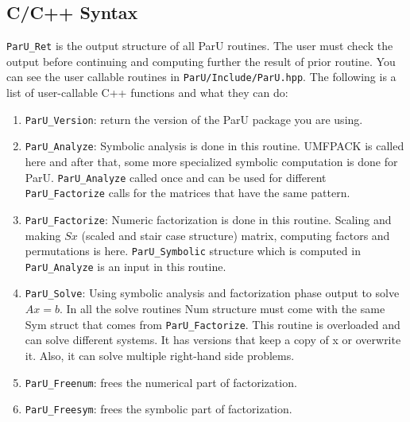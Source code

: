 \documentclass[12pt]{article}
\begin{document}
\subsection{C/C++ Syntax}
\verb'ParU_Ret' is the output structure of all ParU routines. The user must 
check the output before continuing and computing further the result of prior
routine. You can see the user callable routines in 
\verb'ParU/Include/ParU.hpp'.
The following is a list of user-callable C++ functions and what they
can do:

\begin{enumerate}

    \item \verb'ParU_Version': return the version of the ParU package 
        you are using.

    \item \verb'ParU_Analyze': Symbolic analysis is done in this routine. 
        UMFPACK is called here and after that, some more specialized symbolic
        computation is done for ParU. 
        \verb'ParU_Analyze' called once and can be used for different 
        \verb'ParU_Factorize' calls for the matrices that have the same pattern.
    \item \verb'ParU_Factorize': 
        Numeric factorization is done in this routine. Scaling and
        making $Sx$ (scaled and stair case structure) matrix, computing factors 
        and permutations is here. \verb'ParU_Symbolic' structure which is 
        computed in \verb'ParU_Analyze' is an input in this routine.

    \item \verb'ParU_Solve':  
        Using symbolic analysis and factorization phase output to solve $Ax=b$.
        In all the solve routines Num structure must come with the same 
        Sym struct that comes from \verb'ParU_Factorize'. 
        This routine is overloaded and can solve different systems. It has 
        versions that keep a copy of x or overwrite it. Also, it can solve 
        multiple right-hand side problems.

    \item \verb'ParU_Freenum':  frees the numerical part of factorization.


    \item \verb'ParU_Freesym':  frees the symbolic part of factorization.

\end{enumerate}
\end{document}
